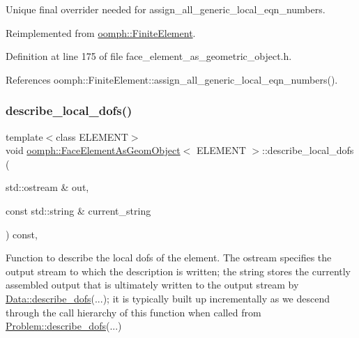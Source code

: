 Unique final overrider needed for assign\+\_\+all\+\_\+generic\+\_\+local\+\_\+eqn\+\_\+numbers. 



Reimplemented from \hyperlink{classoomph_1_1FiniteElement_a564ba080f68132762510b1ec9465b05d}{oomph\+::\+Finite\+Element}.



Definition at line 175 of file face\+\_\+element\+\_\+as\+\_\+geometric\+\_\+object.\+h.



References oomph\+::\+Finite\+Element\+::assign\+\_\+all\+\_\+generic\+\_\+local\+\_\+eqn\+\_\+numbers().

\mbox{\label{classoomph_1_1FaceElementAsGeomObject_a13703c5fac7edda661a3c5cd1f22b9fd}} 
\subsubsection{\texorpdfstring{describe\+\_\+local\+\_\+dofs()}{describe\_local\_dofs()}}
{\footnotesize\ttfamily template$<$class E\+L\+E\+M\+E\+NT$>$ \\
void \hyperlink{classoomph_1_1FaceElementAsGeomObject}{oomph\+::\+Face\+Element\+As\+Geom\+Object}$<$ E\+L\+E\+M\+E\+NT $>$\+::describe\+\_\+local\+\_\+dofs (\begin{DoxyParamCaption}\item[{std\+::ostream \&}]{out,  }\item[{const std\+::string \&}]{current\+\_\+string }\end{DoxyParamCaption}) const\hspace{0.3cm}{\ttfamily [inline]}, {\ttfamily [virtual]}}



Function to describe the local dofs of the element. The ostream specifies the output stream to which the description is written; the string stores the currently assembled output that is ultimately written to the output stream by \hyperlink{classoomph_1_1Data_a2dae16e2dcff9a40029f834c83364df5}{Data\+::describe\+\_\+dofs}(...); it is typically built up incrementally as we descend through the call hierarchy of this function when called from \hyperlink{classoomph_1_1Problem_abc103804eb319ae0b3d43870cc3e1eaf}{Problem\+::describe\+\_\+dofs}(...) 



